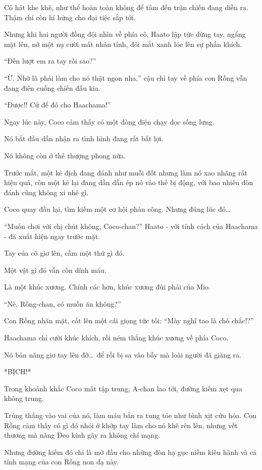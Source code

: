 \documentclass[../main.tex]{subfiles}
\begin{document}
Cô hát khe khẽ, như thể hoàn toàn không để tâm đến trận chiến đang diễn ra. Thậm chí còn hí hửng cho đại tiệc sắp tới.

Nhưng khi hai người đồng đội nhìn về phía cô, Haato lập tức dừng tay, ngẩng mặt lên, nở một nụ cười mất nhân tính, đôi mắt xanh lóe lên sự phấn khích.

``Đến lượt em ra tay rồi sao?''

``Ừ. Nhớ là phải làm cho nó thật ngon nha,'' cậu chỉ tay về phía con Rồng vẫn đang điên cuồng chiến đấu kia.

``Được!! Cứ để đó cho Haachama!''

Ngay lúc này, Coco cảm thấy có một dòng điện chạy dọc sống lưng.

Nó bắt đầu dần nhận ra tình hình đang rất bất lợi.

Nó không còn ở thế thượng phong nữa.

Trước mắt, một kẻ địch đang đánh như muỗi đốt nhưng làm nó xao nhãng rất hiệu quả, còn một kẻ lại đang dần dần ép nó vào thế bị động, với bao nhiêu đòn đánh cũng không xi nhê gì.

Coco quay đầu lại, tìm kiếm một cơ hội phản công. Nhưng đúng lúc đó\dots

``Muốn chơi với chị chút không, Coco-chan?'' Haato - với tính cách của Haachama - đã xuất hiện ngay trước mặt.

Tay của cô giơ lên, cầm một thứ gì đó.

Một vật gì đó vẫn còn dính máu.

Là một khúc xương. Chính các hơn, khúc xương đùi phải của Mio.

``Nè, Rồng-chan, có muốn ăn không?''

Con Rồng nhăn mặt, cất lên một cái giọng tức tối: ``Mày nghĩ tao là chó chắc!?''

Haachama chỉ cười khúc khích, rồi ném thẳng khúc xương về phía Coco.

Nó bản năng giơ tay lên đỡ\dots\ để rồi bị sa vào bẫy mà loài người đã giăng ra.

*BỊCH!*

Trong khoảnh khắc Coco mất tập trung, A-chan lao tới, đường kiếm xẹt qua không trung.

Trúng thẳng vào vai của nó, làm máu bắn ra tung tóe như bình xịt cứu hỏa. Con Rồng cảm thấy có gì đó nhói ở khớp tay làm cho nó khẽ rên lên, nhưng vết thương mà nàng Đeo kính gây ra không chí mạng.

Nhưng đường kiếm đó chỉ là mở đầu cho những đòn hạ gục niềm kiêu hãnh và cả tính mạng của con Rồng non dạ này.
\end{document}
